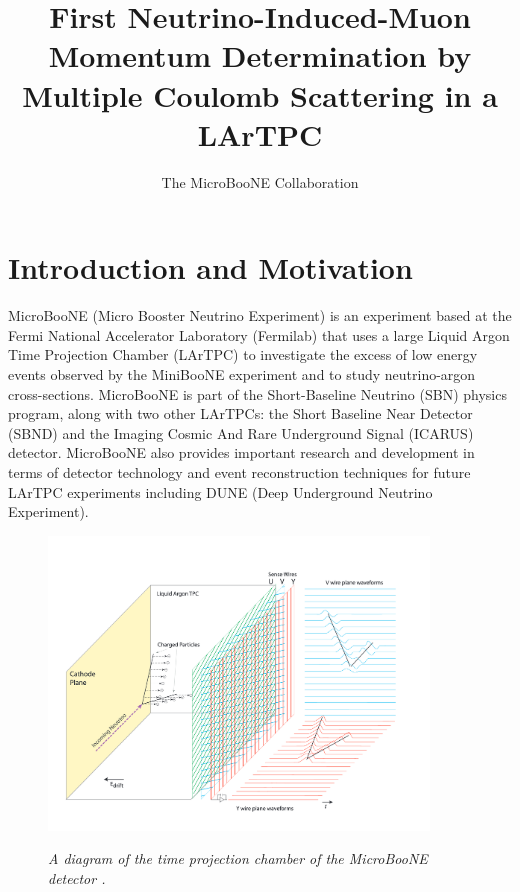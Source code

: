 \documentclass[a4paper,11pt]{article}
\author{The MicroBooNE Collaboration}
\title{First Neutrino-Induced-Muon Momentum Determination by Multiple Coulomb Scattering in a LArTPC}
\begin{document}
\maketitle
\flushbottom

\section{Introduction and Motivation}\label{sec:intro}

MicroBooNE (Micro Booster Neutrino Experiment) is an experiment based at the Fermi National Accelerator Laboratory (Fermilab) that uses a large Liquid Argon Time Projection Chamber (LArTPC) to investigate the excess of low energy events observed by the MiniBooNE experiment \cite{Aguilar-Arevalo:2013pmq} and to study neutrino-argon cross-sections. MicroBooNE is part of the Short-Baseline Neutrino (SBN) physics program, along with two other LArTPCs: the Short Baseline Near Detector (SBND) and the Imaging Cosmic And Rare Underground Signal (ICARUS) detector. MicroBooNE also provides important research and development in terms of detector technology and event reconstruction techniques for future LArTPC experiments including DUNE (Deep Underground Neutrino Experiment).\\

\begin{figure}[ht!]
\centering
	\includegraphics[width=0.9\textwidth]{Figures/static_figs/detector2.png} \\
\caption{\textit{A diagram of the time projection chamber of the MicroBooNE detector \cite{lartpc}.}}\label{detector_fig}
\end{figure}
\end{document}
